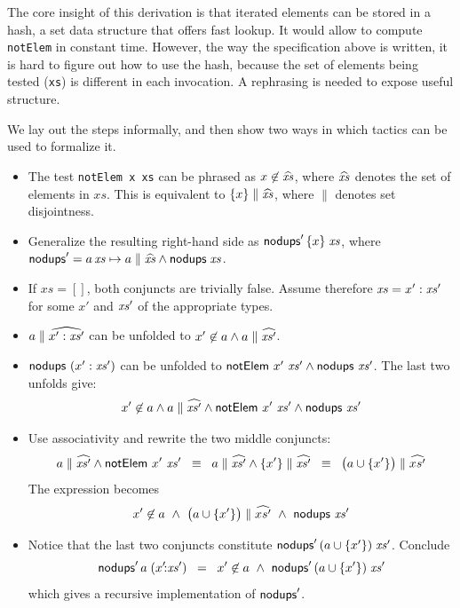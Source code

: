 The core insight of this derivation is that iterated elements can be stored
in a hash, a set data structure that offers fast lookup.
It would allow to compute \lstinline!notElem! in constant time.
However, the way the specification above is written, it is hard to figure out
how to use the hash, because the set of elements being tested (\lstinline!xs!)
is different in each invocation.
A rephrasing is needed to expose useful structure.

We lay out the steps informally, and then show two ways in which \TransCal
tactics can be used to formalize it.

\newcommand\xs{\symvar{xs}}
\newcommand\nodups{\symfun{nodups}}
\newcommand\notElem{\symfun{notElem}}
\newcommand\elem{\symfun{elem}}
\newcommand\ys{\symvar{ys}}

\begin{itemize}
\item
The test \lstinline!notElem x xs!
can be phrased as $x \not\in \widehat{\xs}$, where $\widehat{\xs}$ denotes
the set of elements in $xs$.
This is equivalent to $\{x\} \parallel \widehat{\xs}$, where $\parallel$
denotes set disjointness.
\item
Generalize the resulting right-hand side as $\nodups' \, \{x\} \; \xs$,
  where $\nodups' = a\,\xs \mapsto a\parallel\widehat{\xs} \land \nodups\;\xs$.
\item 
If $xs=[]$, both conjuncts are trivially false.
Assume therefore $\xs = x' : \xs'$ for some $x'$ and $\xs'$ of the appropriate
types.
\item
$a \parallel \widehat{x':\xs'}$ can be unfolded to
$x'\not\in a \land a \parallel \widehat{\xs'}$.
\item $\nodups~(x':\xs')$ can be unfolded to
$\notElem~x'~\xs' \land \nodups~\xs'$. The last two unfolds give:
\[x'\not\in a \land a \parallel \widehat{\xs'} \land
  \notElem~x'~\xs' \land \nodups~\xs'\]
\item Use associativity and rewrite the two middle conjuncts:
\[a \parallel \widehat{\xs'} \land
  \notElem~x'~\xs' 
  \;\;\;{\equiv}\;\;\;
  a \parallel \widehat{\xs'} \land
  \{x'\} \parallel \widehat{\xs'}
  \;\;\;{\equiv}\;\;\;
  \big(a \cup \{x'\}\big) \parallel \widehat{xs'}\]
The expression becomes
\[x'\not\in a ~\land~ \big(a \cup \{x'\}\big) \parallel \widehat{xs'}
  ~\land~ \nodups~\xs'\]
\item Notice that the last two conjuncts constitute $\nodups'\,(a\cup\{x'\})\;\xs'$.
  Conclude
\[\nodups'\,a\;(x'\!{:}\xs') \;\;=\;\; x'\not\in a ~\land~ \nodups'\,(a\cup\{x'\})\;\xs'\]
which gives a recursive implementation of $\nodups'$.
\end{itemize}

